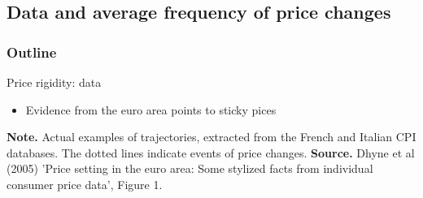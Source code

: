 \documentclass{beamer}
\begin{document}
\subsection{Data and average frequency of price changes}
\begin{frame}
\frametitle{Outline}
\tableofcontents[currentsubsection]
\end{frame}
\begin{frame}{Price rigidity: data}

\begin{itemize}
\small
\item Evidence from the euro area points to sticky pices
\end{itemize}

\begin{center}

\begin{figure}[h!]
	
\end{figure}

\begin{minipage}{1.0\columnwidth}
\tiny	
\textbf{Note.} Actual examples of trajectories, extracted from the French and Italian CPI databases. The dotted lines indicate events of price changes.
\textbf{Source.} Dhyne et al (2005) 'Price setting in the euro area: Some stylized facts from individual consumer price data', Figure 1.\\
\end{minipage}
\end{center}

\end{frame}
\end{document}
